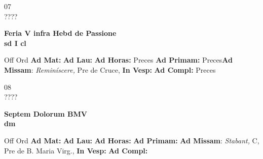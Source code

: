 \documentclass[10pt, openany]{book}
\begin{document}
    \begin{center}
        \begin{minipage}{3.5in}
            \vspace{2em}
            \begin{minipage}{0.5in}
                {\Huge 07} \\
                {\normalsize ????}
            \end{minipage}
            \begin{minipage}{3.0in}
                \textbf{ \large Feria V infra Hebd de Passione \\
                \textnormal{\normalsize sd I cl}}

            \end{minipage}
            \begin{justify}Off Ord
                \textbf{Ad Mat: }
                \textbf{Ad Lau: }
                \textbf{Ad Horas: }Preces
                \textbf{Ad Primam: }Preces\textbf{Ad Missam}: \textit{Reminíscere,} Pre de Cruce, 
                \textbf{In Vesp: }
                \textbf{Ad Compl: }Preces
            \end{justify}
        \end{minipage}
    \end{center}

    \begin{center}
        \begin{minipage}{3.5in}
            \vspace{2em}
            \begin{minipage}{0.5in}
                {\Huge 08} \\
                {\normalsize ????}
            \end{minipage}
            \begin{minipage}{3.0in}
                \textbf{ \large Septem Dolorum BMV \\
                \textnormal{\normalsize dm}}

            \end{minipage}
            \begin{justify}Off Ord
                \textbf{Ad Mat: }
                \textbf{Ad Lau: }
                \textbf{Ad Horas: }
                \textbf{Ad Primam: }\textbf{Ad Missam}: \textit{Stabant,} C, Pre de B. Maria Virg., 
                \textbf{In Vesp: }
                \textbf{Ad Compl: }
            \end{justify}
        \end{minipage}
    \end{center}
\end{document}
